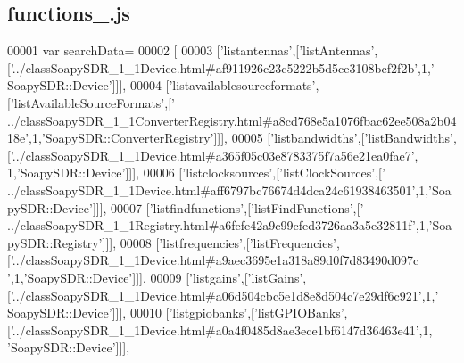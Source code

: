 \subsection{functions\+\_.\+js}
\label{functions__8_8js_source}

\begin{DoxyCode}
00001 var searchData=
00002 [
00003   [\textcolor{stringliteral}{'listantennas'},[\textcolor{stringliteral}{'listAntennas'},[\textcolor{stringliteral}{'../classSoapySDR\_1\_1Device.html#af911926c23c5222b5d5ce3108bcf2f2b'},1,\textcolor{stringliteral}{'
      SoapySDR::Device'}]]],
00004   [\textcolor{stringliteral}{'listavailablesourceformats'},[\textcolor{stringliteral}{'listAvailableSourceFormats'},[\textcolor{stringliteral}{'
      ../classSoapySDR\_1\_1ConverterRegistry.html#a8cd768e5a1076fbac62ee508a2b0418e'},1,\textcolor{stringliteral}{'SoapySDR::ConverterRegistry'}]]],
00005   [\textcolor{stringliteral}{'listbandwidths'},[\textcolor{stringliteral}{'listBandwidths'},[\textcolor{stringliteral}{'../classSoapySDR\_1\_1Device.html#a365f05c03e8783375f7a56e21ea0fae7'},
      1,\textcolor{stringliteral}{'SoapySDR::Device'}]]],
00006   [\textcolor{stringliteral}{'listclocksources'},[\textcolor{stringliteral}{'listClockSources'},[\textcolor{stringliteral}{'
      ../classSoapySDR\_1\_1Device.html#aff6797bc76674d4dca24c61938463501'},1,\textcolor{stringliteral}{'SoapySDR::Device'}]]],
00007   [\textcolor{stringliteral}{'listfindfunctions'},[\textcolor{stringliteral}{'listFindFunctions'},[\textcolor{stringliteral}{'
      ../classSoapySDR\_1\_1Registry.html#a6fefe42a9c99cfed3726aa3a5e32811f'},1,\textcolor{stringliteral}{'SoapySDR::Registry'}]]],
00008   [\textcolor{stringliteral}{'listfrequencies'},[\textcolor{stringliteral}{'listFrequencies'},[\textcolor{stringliteral}{'../classSoapySDR\_1\_1Device.html#a9aec3695e1a318a89d0f7d83490d097c
      '},1,\textcolor{stringliteral}{'SoapySDR::Device'}]]],
00009   [\textcolor{stringliteral}{'listgains'},[\textcolor{stringliteral}{'listGains'},[\textcolor{stringliteral}{'../classSoapySDR\_1\_1Device.html#a06d504cbc5e1d8e8d504c7e29df6c921'},1,\textcolor{stringliteral}{'
      SoapySDR::Device'}]]],
00010   [\textcolor{stringliteral}{'listgpiobanks'},[\textcolor{stringliteral}{'listGPIOBanks'},[\textcolor{stringliteral}{'../classSoapySDR\_1\_1Device.html#a0a4f0485d8ae3ece1bf6147d36463e41'},1,\textcolor{stringliteral}{
      'SoapySDR::Device'}]]],

\end{DoxyCode}
